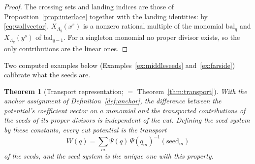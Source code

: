 \documentclass[11pt]{amsart}
\newtheorem{theorem}{Theorem}[section]
\theoremstyle{definition}
\theoremstyle{remark}
\begin{document}
\begin{proof}
The crossing sets and landing indices are those of
Proposition~\ref{prop:interlace} together with the landing identities: by
\eqref{eq:wallvector}, $X_{\Lambda_{q}}(x^{r})$ is a nonzero rational
multiple of the monomial $\mathrm{bal}_{q}$ and $X_{\Lambda_{q}}(y^{s})$ of
$\mathrm{bal}_{q-1}$. For a singleton
monomial no proper divisor exists, so the only contributions are the linear
ones.
\end{proof}

Two computed examples below (Examples~\ref{ex:middleseeds}
and~\ref{ex:farside}) calibrate what the seeds are.

\begin{theorem}[Transport representation; $=$ Theorem~\ref{thm:transport}]
\label{thm:transport7}
With the anchor assignment of Definition~\ref{def:anchor}, the difference between
the potential's coefficient vector on a monomial and the transported contributions
of the seeds of its proper divisors is independent of the cut. Defining the
\emph{seed system} by these constants, every cut potential is the transport
\[
W(q)=\sum_{m}\Psi(q)\,\Psi(q_m)^{-1}(\mathrm{seed}_{m})
\]
of the seeds, and the seed system is the unique one with this property.
\end{theorem}
\end{document}

